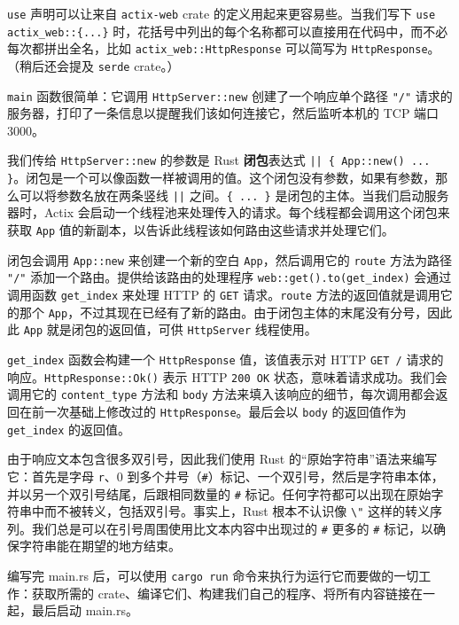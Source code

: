 \texttt{use} 声明可以让来自 \texttt{actix-web} crate 的定义用起来更容易些。当我们写下 \texttt{use actix\_web::\{...\}} 时，花括号中列出的每个名称都可以直接用在代码中，而不必每次都拼出全名，比如 \texttt{actix\_web::HttpResponse} 可以简写为 \texttt{HttpResponse}。（稍后还会提及 \texttt{serde} crate。）

\texttt{main} 函数很简单：它调用 \texttt{HttpServer::new} 创建了一个响应单个路径 \texttt{"/"} 请求的服务器，打印了一条信息以提醒我们该如何连接它，然后监听本机的 TCP 端口 3000。

我们传给 \texttt{HttpServer::new} 的参数是 Rust \textbf{闭包}表达式 \texttt{|| \{ App::new() ... \}}。闭包是一个可以像函数一样被调用的值。这个闭包没有参数，如果有参数，那么可以将参数名放在两条竖线 \texttt{||} 之间。\texttt{\{ ... \}} 是闭包的主体。当我们启动服务器时，Actix 会启动一个线程池来处理传入的请求。每个线程都会调用这个闭包来获取 \texttt{App} 值的新副本，以告诉此线程该如何路由这些请求并处理它们。

闭包会调用 \texttt{App::new} 来创建一个新的空白 \texttt{App}，然后调用它的 \texttt{route} 方法为路径 \texttt{"/"} 添加一个路由。提供给该路由的处理程序 \texttt{web::get().to(get\_index)} 会通过调用函数 \texttt{get\_index} 来处理 HTTP 的 \texttt{GET} 请求。\texttt{route} 方法的返回值就是调用它的那个 \texttt{App}，不过其现在已经有了新的路由。由于闭包主体的末尾没有分号，因此此 \texttt{App} 就是闭包的返回值，可供 \texttt{HttpServer} 线程使用。

\texttt{get\_index} 函数会构建一个 \texttt{HttpResponse} 值，该值表示对 HTTP \texttt{GET /} 请求的响应。\texttt{HttpResponse::Ok()} 表示 HTTP \texttt{200 OK} 状态，意味着请求成功。我们会调用它的 \texttt{content\_type} 方法和 \texttt{body} 方法来填入该响应的细节，每次调用都会返回在前一次基础上修改过的 \texttt{HttpResponse}。最后会以 \texttt{body} 的返回值作为 \texttt{get\_index} 的返回值。

由于响应文本包含很多双引号，因此我们使用 Rust 的“原始字符串”语法来编写它：首先是字母 \texttt{r}、0 到多个井号（\texttt{\#}）标记、一个双引号，然后是字符串本体，并以另一个双引号结尾，后跟相同数量的 \texttt{\#} 标记。任何字符都可以出现在原始字符串中而不被转义，包括双引号。事实上，Rust 根本不认识像 \texttt{\textbackslash{}"} 这样的转义序列。我们总是可以在引号周围使用比文本内容中出现过的 \texttt{\#} 更多的 \texttt{\#} 标记，以确保字符串能在期望的地方结束。

编写完 main.rs 后，可以使用 \texttt{cargo run} 命令来执行为运行它而要做的一切工作：获取所需的 crate、编译它们、构建我们自己的程序、将所有内容链接在一起，最后启动 main.rs。

